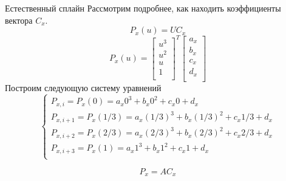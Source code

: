 \documentclass{beamer}
\begin{document}
	\begin{frame}{Естественный сплайн}
		Рассмотрим подробнее, как находить коэффициенты вектора $C_x$.
		\[
			P_x(u) = U C_x
		\]
		\[
			P_x(u) = 
			\begin{bmatrix}
				u^3 \\
				u^2 \\
				u \\
				1 \\
			\end{bmatrix}^T
			\begin{bmatrix}
				a_x \\
				b_x \\
				c_x \\
				d_x \\
			\end{bmatrix}
		\]
		Построим следующую систему уравнений
		\[
			\begin{cases}
				P_{x,i} = P_x(0) = a_x 0^3 + b_x 0^2 + c_x 0 + d_x \\
				P_{x,i+1} = P_x(1/3) = a_x (1/3)^3 + b_x (1/3)^2 + c_x 1/3 + d_x \\
				P_{x,i+2} = P_x(2/3) = a_x (2/3)^3 + b_x (2/3)^2 + c_x 2/3+ d_x \\
				P_{x,i+3} = P_x(1) = a_x 1^3 + b_x 1^2 + c_x 1 + d_x \\
			\end{cases}
		\]

		
		\[
			P_x = A C_x
		\]
		\note{
			\[
				\begin{bmatrix}
					P_{x,i} \\
					P_{x,i+1} \\
					P_{x,i+2} \\
					P_{x,i+3} \\
				\end{bmatrix}
				=
				\begin{bmatrix}
					0 & 0 & 0 & 1 \\
					(1/3)^3 & (1/3)^2 & 1/3 & 1 \\
					(2/3)^3 & (2/3)^2 & 2/3 & 1 \\
					1^3 & 1^2 & 1 & 1 \\
				\end{bmatrix}
				\begin{bmatrix}
					a_x \\
					b_x \\
					c_x \\
					d_x \\
				\end{bmatrix}
			\]
	
}
\end{frame}
\end{document}

